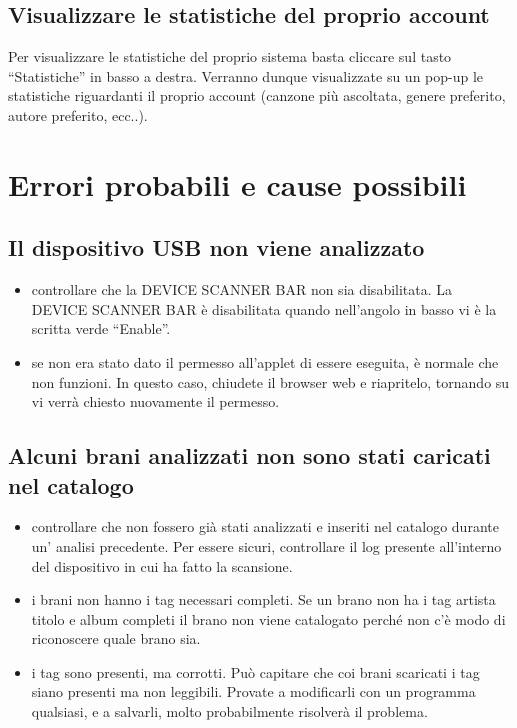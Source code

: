 \subsection{Visualizzare le statistiche del proprio account}

Per visualizzare le statistiche del proprio sistema basta cliccare sul tasto
``Statistiche'' in basso a destra. Verranno dunque visualizzate su un pop-up le
statistiche riguardanti il proprio account (canzone pi\`u
ascoltata, genere preferito, autore preferito, ecc..).

\section{Errori probabili e cause possibili}

\subsection*{Il dispositivo USB non viene analizzato}
\begin{itemize}
  \item controllare che la DEVICE SCANNER BAR non sia disabilitata. La DEVICE
  SCANNER BAR \`e disabilitata quando nell'angolo in basso vi \`e la scritta
  verde ``Enable''.
  \item se non era stato dato il permesso all'applet di essere eseguita, \`e
  normale che non funzioni. In questo caso, chiudete il browser web e
  riapritelo, tornando su  vi verr\`a chiesto nuovamente il
  permesso.
\end{itemize}

\subsection*{Alcuni brani analizzati non sono stati caricati nel catalogo}
\begin{itemize}
  \item controllare che non fossero gi\`a stati analizzati e inseriti nel
  catalogo durante un' analisi precedente. Per essere sicuri, controllare il log
  presente all'interno del dispositivo in cui  ha fatto la scansione.
  \item i brani non hanno i tag necessari completi. Se un brano non ha i
  tag artista titolo e album completi il brano non viene catalogato perch\'e non
  c'\`e modo di riconoscere quale brano sia.
  \item i tag sono presenti, ma corrotti. Pu\`o capitare che coi brani scaricati i tag
  siano presenti ma non leggibili. Provate a modificarli con un programma qualsiasi, e 
  a salvarli, molto probabilmente risolver\`a il problema.
\end{itemize}

